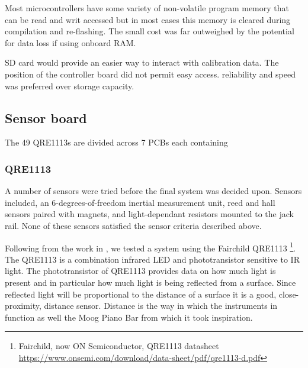 Most microcontrollers have some variety of non-volatile program memory
that can be read and writ accessed but in most cases this memory is
cleared during compilation and re-flashing. The small cost was far
outweighed by the potential for data loss if using onboard RAM.




SD card would provide an easier way to interact with calibration data.
The position of the controller board did not permit easy access.
reliability and speed was preferred over storage capacity.

\subsection{Sensor board}\label{sensor-board}

The 49 QRE1113s are divided across 7 PCBs each containing

\subsubsection{QRE1113}\label{qre1113}


A number of sensors were tried before the final system was decided upon.
Sensors included, an 6-degrees-of-freedom inertial measurement unit,
reed and hall sensors paired with magnets, and light-dependant resistors mounted to the jack rail.
None of these sensors satisfied the sensor criteria described above.

Following from the work in \cite{McPherson2013, McPherson2019}, we tested
a system using the Fairchild QRE1113 \footnote{Fairchild, now ON Semiconductor, QRE1113 datasheet \url{https://www.onsemi.com/download/data-sheet/pdf/qre1113-d.pdf}}. The
QRE1113 is a combination infrared LED and phototransistor sensitive to
IR light. The phototransistor of QRE1113 provides data on how much light
is present and in particular how much light is being reflected from a
surface. Since reflected light will be proportional to the distance of
a surface it is a good, close-proximity, distance sensor. Distance is
the way in which the instruments in \cite{McPherson2013, McPherson2019}
function as well the Moog Piano Bar from which it took inspiration.


